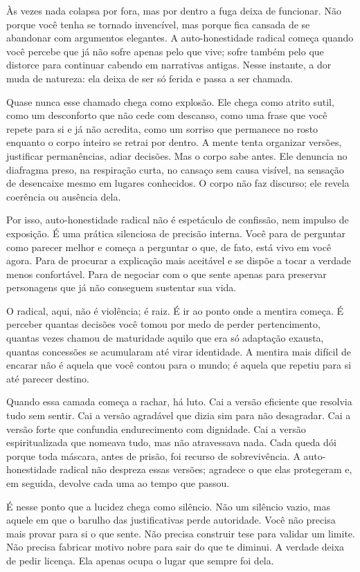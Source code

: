\documentclass[12pt]{book}
\begin{document}
Às vezes nada colapsa por fora, mas por dentro a fuga deixa de funcionar. Não porque você tenha se tornado invencível, mas porque fica cansada de se abandonar com argumentos elegantes. A auto-honestidade radical começa quando você percebe que já não sofre apenas pelo que vive; sofre também pelo que distorce para continuar cabendo em narrativas antigas. Nesse instante, a dor muda de natureza: ela deixa de ser só ferida e passa a ser chamada.

Quase nunca esse chamado chega como explosão. Ele chega como atrito sutil, como um desconforto que não cede com descanso, como uma frase que você repete para si e já não acredita, como um sorriso que permanece no rosto enquanto o corpo inteiro se retrai por dentro. A mente tenta organizar versões, justificar permanências, adiar decisões. Mas o corpo sabe antes. Ele denuncia no diafragma preso, na respiração curta, no cansaço sem causa visível, na sensação de desencaixe mesmo em lugares conhecidos. O corpo não faz discurso; ele revela coerência ou ausência dela.

Por isso, auto-honestidade radical não é espetáculo de confissão, nem impulso de exposição. É uma prática silenciosa de precisão interna. Você para de perguntar como parecer melhor e começa a perguntar o que, de fato, está vivo em você agora. Para de procurar a explicação mais aceitável e se dispõe a tocar a verdade menos confortável. Para de negociar com o que sente apenas para preservar personagens que já não conseguem sustentar sua vida.

O radical, aqui, não é violência; é raiz. É ir ao ponto onde a mentira começa. É perceber quantas decisões você tomou por medo de perder pertencimento, quantas vezes chamou de maturidade aquilo que era só adaptação exausta, quantas concessões se acumularam até virar identidade. A mentira mais difícil de encarar não é aquela que você contou para o mundo; é aquela que repetiu para si até parecer destino.

Quando essa camada começa a rachar, há luto. Cai a versão eficiente que resolvia tudo sem sentir. Cai a versão agradável que dizia sim para não desagradar. Cai a versão forte que confundia endurecimento com dignidade. Cai a versão espiritualizada que nomeava tudo, mas não atravessava nada. Cada queda dói porque toda máscara, antes de prisão, foi recurso de sobrevivência. A auto-honestidade radical não despreza essas versões; agradece o que elas protegeram e, em seguida, devolve cada uma ao tempo que passou.

É nesse ponto que a lucidez chega como silêncio. Não um silêncio vazio, mas aquele em que o barulho das justificativas perde autoridade. Você não precisa mais provar para si o que sente. Não precisa construir tese para validar um limite. Não precisa fabricar motivo nobre para sair do que te diminui. A verdade deixa de pedir licença. Ela apenas ocupa o lugar que sempre foi dela.
\end{document}
